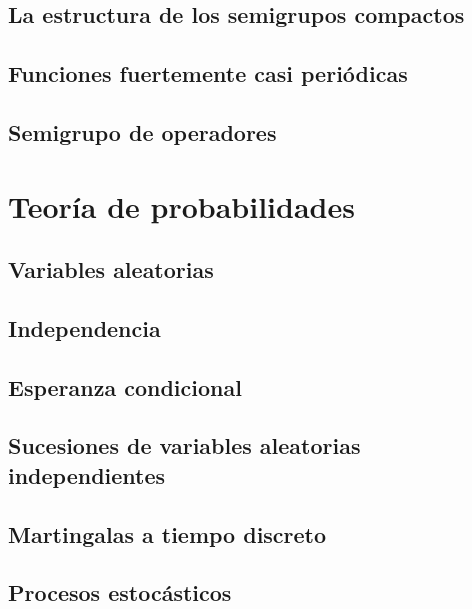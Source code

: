 \documentclass[12pt,]{krantz}
\theoremstyle{definition}
\theoremstyle{definition}
\theoremstyle{definition}
\theoremstyle{remark}
\begin{document}
\section{La estructura de los semigrupos
compactos}\label{la-estructura-de-los-semigrupos-compactos}

\section{Funciones fuertemente casi
periódicas}\label{funciones-fuertemente-casi-periodicas}

\section{Semigrupo de operadores}\label{semigrupo-de-operadores}

\chapter{Teoría de probabilidades}\label{teoria-de-probabilidades}

\section{Variables aleatorias}\label{variables-aleatorias}

\section{Independencia}\label{independencia}

\section{Esperanza condicional}\label{esperanza-condicional}

\section{Sucesiones de variables aleatorias
independientes}\label{sucesiones-de-variables-aleatorias-independientes}

\section{Martingalas a tiempo
discreto}\label{martingalas-a-tiempo-discreto}

\section{Procesos estocásticos}\label{procesos-estocasticos}
\end{document}
